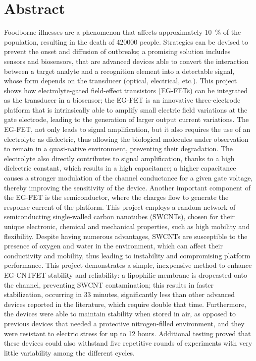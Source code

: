 \chapter*{Abstract}

Foodborne illnesses are a phenomenon that affects approximately
\SI{10}{\percent} of the population, resulting in the death of \num{420000}
people. Strategies can be devised to prevent the onset and diffusion of
outbreaks; a promising solution includes sensors and biosensors, that are
advanced devices able to convert the interaction between a target analyte and a
recognition element into a detectable signal, whose form depends on the
transducer (optical, electrical, etc.). This project shows how electrolyte-gated
field-effect transistors (EG-FETs) can be integrated as the transducer in a
biosensor; the EG-FET is an innovative three-electrode platform that is
intrinsically able to amplify small electric field variations at the gate
electrode, leading to the generation of larger output current variations. The
EG-FET, not only leads to signal amplification, but it also requires the use of
an electrolyte as dielectric, thus allowing the biological molecules under
observation to remain in a quasi-native environment, preventing their
degradation. The electrolyte also directly contributes to signal amplification,
thanks to a high dielectric constant, which results in a high capacitance; a
higher capacitance causes a stronger modulation of the channel conductance for a
given gate voltage, thereby improving the sensitivity of the device. Another
important component of the EG-FET is the semiconductor, where the charges flow
to generate the response current of the platform. This project employs a random
network of semiconducting single-walled carbon nanotubes (SWCNTs), chosen for
their unique electronic, chemical and mechanical properties, such as high
mobility and flexibility. Despite having numerous advantages, SWCNTs are
susceptible to the presence of oxygen and water in the environment, which can
affect their conductivity and mobility, thus leading to instability and
compromising platform performance. This project demonstrates a simple,
inexpensive method to enhance EG-CNTFET stability and reliability: a lipophilic
membrane is dropcasted onto the channel, preventing SWCNT contamination; this
results in faster stabilization, occurring in 33 minutes, significantly less
than other advanced devices reported in the literature, which require double
that time. Furthermore, the devices were able to maintain stability when stored
in air, as opposed to previous devices that needed a protective nitrogen-filled
environment, and they were resistant to electric stress for up to 12 hours.
Additional testing proved that these devices could also withstand five
repetitive rounds of experiments with very little variability among the
different cycles. 


